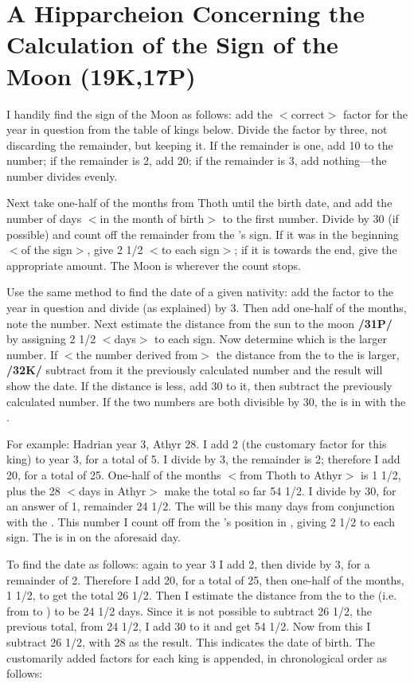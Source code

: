 \section{A Hipparcheion Concerning the Calculation of the Sign of the Moon (19K,17P)}

I handily find the sign of the Moon as follows: add the $<$correct$>$ factor for the year in question from the table of kings below. Divide the factor by three, not discarding the remainder, but keeping it. If the remainder is one, add 10 to the number; if the remainder is 2, add 20; if the remainder is 3, add nothing—the number divides evenly. 

Next take one-half of the months from Thoth until the birth date, and add the number of days $<$in the month of birth$>$ to the first number. Divide by 30 (if possible) and count off the remainder from the \Sun’s sign. If it was in the beginning $<$of the sign$>$, give 2 1/2 $<$to each sign$>$; if it is towards the end, give the appropriate amount. The Moon is wherever the count stops.

Use the same method to find the date of a given nativity: add the factor to the year in question and divide (as explained) by 3. Then add one-half of the months, note the number. Next estimate the distance from the sun to the moon \textbf{/31P/} by assigning 2 1/2 $<$days$>$ to each sign. Now determine which is the larger number. If $<$the number derived from$>$ the distance from the \Sun\xspace to the \Moon\xspace is larger, \textbf{/32K/} subtract from it the previously calculated number and the result will show the date. If the distance is less, add 30 to it, then subtract the previously calculated number. If the two numbers are both divisible by 30, the \Moon\xspace is in \Conjunction with the \Sun.

For example: Hadrian year 3, Athyr 28. I add 2 (the customary factor for this king) to year 3, for a total of 5. I divide by 3, the remainder is 2; therefore I add 20, for a total of 25. One-half of the months $<$from Thoth to Athyr$>$ is 1 1/2, plus the 28 $<$days in Athyr$>$ make the total so far 54 1/2. I divide by 30, for an answer of 1, remainder 24 1/2. The \Moon\xspace will be this many days from conjunction with the \Sun. This number I count off from the \Sun’s position in \Sagittarius, giving 2 1/2 to each sign. The \Moon\xspace is in \Virgo\xspace on the aforesaid day.

To find the date as follows: again to year 3 I add 2, then divide by 3, for a remainder of 2. Therefore I add 20, for a total of 25, then one-half of the months, 1 1/2, to get the total 26 1/2. Then I estimate the distance from the \Sun\xspace to the \Moon\xspace (i.e. from \Sagittarius\xspace to \Virgo) to be 24 1/2 days. Since it is not possible to subtract 26 1/2, the previous total, from 24 1/2, I add 30 to it and get 54 1/2. Now from this I subtract 26 1/2, with 28 as the result. This indicates the date of birth. The customarily added factors for each king is appended, in chronological order as follows:

